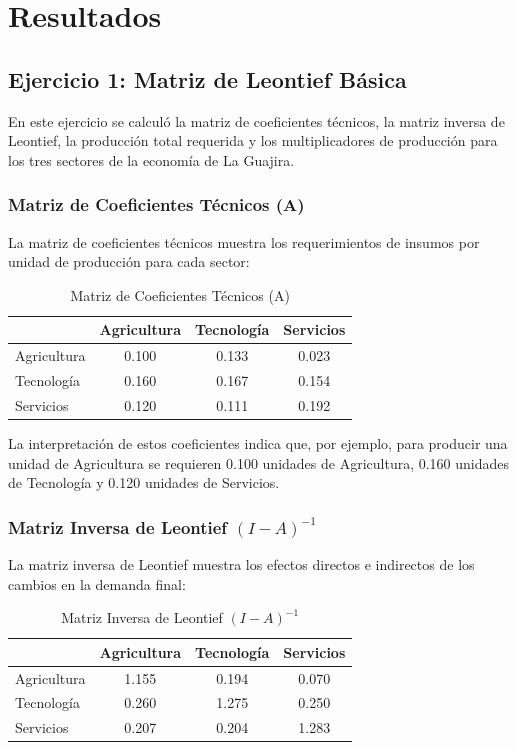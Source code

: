 \section{Resultados}

\subsection{Ejercicio 1: Matriz de Leontief Básica}

En este ejercicio se calculó la matriz de coeficientes técnicos, la matriz inversa de Leontief, la producción total requerida y los multiplicadores de producción para los tres sectores de la economía de La Guajira.

\subsubsection{Matriz de Coeficientes Técnicos (A)}

La matriz de coeficientes técnicos muestra los requerimientos de insumos por unidad de producción para cada sector:

\begin{table}[H]
\centering
\caption{Matriz de Coeficientes Técnicos (A)}
\begin{tabular}{lccc}
\toprule
 & Agricultura & Tecnología & Servicios \\
\midrule
Agricultura & 0.100 & 0.133 & 0.023 \\
Tecnología & 0.160 & 0.167 & 0.154 \\
Servicios & 0.120 & 0.111 & 0.192 \\
\bottomrule
\end{tabular}
\end{table}

La interpretación de estos coeficientes indica que, por ejemplo, para producir una unidad de Agricultura se requieren 0.100 unidades de Agricultura, 0.160 unidades de Tecnología y 0.120 unidades de Servicios.

\subsubsection{Matriz Inversa de Leontief $(I - A)^{-1}$}

La matriz inversa de Leontief muestra los efectos directos e indirectos de los cambios en la demanda final:

\begin{table}[H]
\centering
\caption{Matriz Inversa de Leontief $(I - A)^{-1}$}
\begin{tabular}{lccc}
\toprule
 & Agricultura & Tecnología & Servicios \\
\midrule
Agricultura & 1.155 & 0.194 & 0.070 \\
Tecnología & 0.260 & 1.275 & 0.250 \\
Servicios & 0.207 & 0.204 & 1.283 \\
\bottomrule
\end{tabular}
\end{table}

